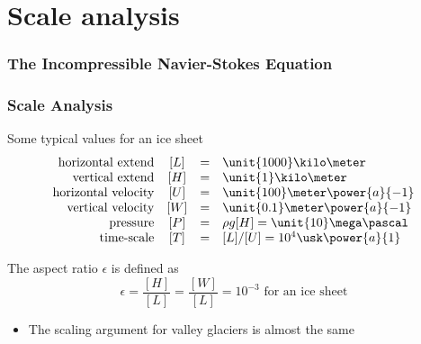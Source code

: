 \documentclass[hide notes,intlimits]{beamer}
\begin{document}
 
\section{Scale analysis}

\begin{frame}
  \frametitle{The Incompressible Navier-Stokes Equation}
\end{frame}
 
\begin{frame}
  \frametitle{Scale Analysis}
  \begin{block}{Some typical values for an ice sheet}
  \begin{equation*}
  \begin{array}{rccl}
    \text{horizontal extend} &  [L] & = & \unit{1000}\kilo\meter\\
    \text{vertical extend} & [H] & = & \unit{1}\kilo\meter \\
    \text{horizontal velocity} & [U] & = & \unit{100}\meter\power{a}{-1}\\
    \text{vertical velocity} & [W] & = & \unit{0.1}\meter\power{a}{-1}\\
    \text{pressure} & [P] & = & \rho g[H] = \unit{10}\mega\pascal\\
    \text{time-scale} & [T] & = &[L]/[U] = 10^{4}\usk\power{a}{1}\\
  \end{array}
  \end{equation*}
  \end{block}
  The aspect ratio $\epsilon$ is defined as
  \begin{equation*}
    \epsilon = \frac{[H]}{[L]} = \frac{[W]}{[L]} = 10^{-3} \text{ for an ice sheet}
  \end{equation*}
  \begin{itemize}
    \item The scaling argument for valley glaciers is almost the same
  \end{itemize}
\end{frame}
\end{document}
